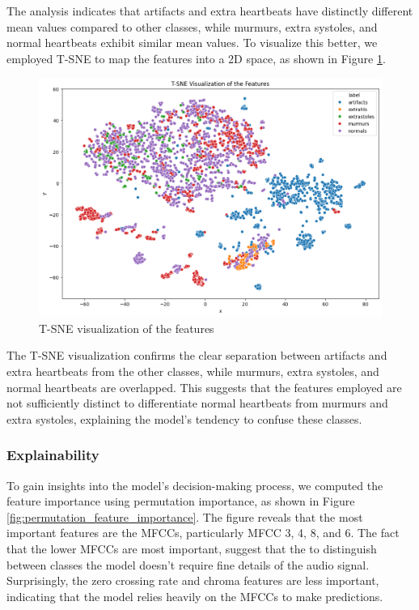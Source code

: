 \noindent
The analysis indicates that artifacts and extra heartbeats have distinctly different mean values compared to other classes, while murmurs, extra systoles,
and normal heartbeats exhibit similar mean values. To visualize this better, we employed T-SNE to map the features into a 2D space, as shown in Figure \ref{fig:t_sne_visualization}.

\begin{figure}[h]
    \centering
    \includegraphics[width=\columnwidth]{../images/t-sne_feature_visualization.png}
    \caption{T-SNE visualization of the features}
    \label{fig:t_sne_visualization}
\end{figure}
\noindent
The T-SNE visualization confirms the clear separation between artifacts and extra heartbeats from the other classes, while murmurs, extra systoles,
and normal heartbeats are overlapped. This suggests that the features employed are not sufficiently distinct to differentiate normal heartbeats
from murmurs and extra systoles, explaining the model's tendency to confuse these classes.


\subsubsection*{Explainability}

To gain insights into the model's decision-making process, we computed the feature importance using permutation importance,
as shown in Figure \ref{fig:permutation_feature_importance}. The figure reveals that the most important features are the MFCCs, particularly MFCC 3, 4, 8, and 6.
The fact that the lower MFCCs are most important, suggest that the to distinguish between classes the model doesn't require fine details of the audio signal.
Surprisingly, the zero crossing rate and chroma features are less important, indicating that the model relies heavily on the MFCCs to make predictions.

